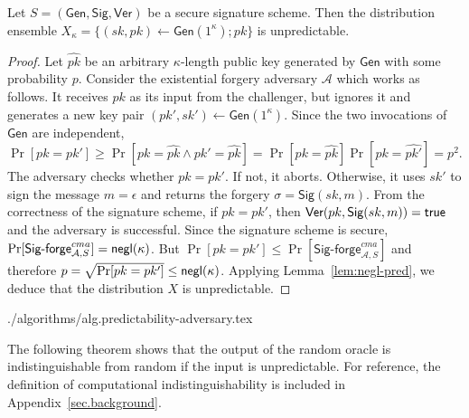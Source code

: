 \begin{lemma}\label{lem:pk-unpredictability}
  Let $S = (\textsf{Gen}, \textsf{Sig}, \textsf{Ver})$ be a secure signature scheme.
  Then the distribution ensemble
  $X_\kappa = \{(sk, pk) \gets \textsf{Gen}(1^\kappa); pk\}$ is
  unpredictable.
\end{lemma}
\begin{proof}
  Let $\widehat{pk}$ be an arbitrary $\kappa$-length public key generated
  by $\textsf{Gen}$ with some probability $p$.
  Consider the existential forgery adversary $\mathcal{A}$ which works as
  follows. It receives $pk$ as its input from the challenger, but ignores it
  and generates a new key pair $(pk', sk') \gets \textsf{Gen}(1^\kappa)$.
  Since the
  two invocations of $\textsf{Gen}$ are independent,
  $\Pr[pk = pk'] \geq \Pr[pk = \widehat{pk} \land pk' = \widehat{pk}]
  = \Pr[pk = \widehat{pk}]\Pr[pk = \widehat{pk'}] = p^2$. The adversary checks
  whether $pk = pk'$. If not, it aborts. Otherwise, it uses $sk'$ to sign the
  message $m = \epsilon$ and returns the forgery $\sigma = \textsf{Sig}(sk, m)$.
  From the correctness of the signature scheme, if $pk = pk'$, then
  $\textsf{Ver}(pk, \textsf{Sig}(sk, m)) = \mathsf{true}$ and the adversary is
  successful. Since the signature scheme is secure,
  $\Pr[\textsf{Sig-forge}^{cma}_{\mathcal{A},S}] = \textsf{negl}(\kappa)$.
  But $\Pr[pk = pk'] \leq \Pr[\textsf{Sig-forge}^{cma}_{\mathcal{A},S}]$ and
  therefore $p = \sqrt{\Pr[pk = pk']} \leq \textsf{negl}(\kappa)$. Applying
  Lemma~\ref{lem:negl-pred}, we deduce that the distribution $X$ is
  unpredictable.
\end{proof}

{./algorithms/alg.predictability-adversary.tex}

The following theorem shows that the output of the random oracle is
indistinguishable from random if the input is unpredictable. For reference, the
definition of computational indistinguishability is included in
Appendix~\ref{sec.background}.

